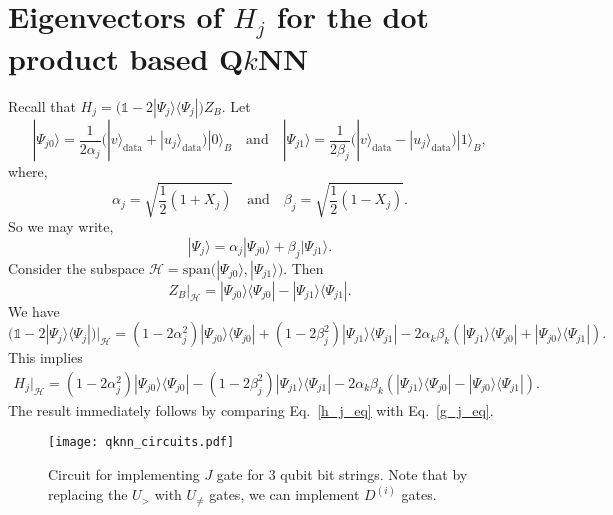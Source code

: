 \documentclass[a4paper,twocolumn,11pt,unpublished]{quantumarticle}
\newcommand{\rang}{\rangle}
\newcommand{\lang}{\langle}
\begin{document}
\section{Eigenvectors of $H_j$ for the dot product based  Q$k$NN} \label{eigH}
    Recall that $H_j = \Big( \mathds{1} - 2 |\Psi_{j}\rang \lang \Psi_{j}| \Big) Z_B$. Let 
    \begin{equation}
        |\Psi_{j0}\rang = \frac{1}{2 \alpha_j} \Big( |v\rang_{\text{data}} + |u_j\rang_{\text{data}}\Big) |0\rang_B \quad \text{and} \quad 
        |\Psi_{j1}\rang = \frac{1}{2 \beta_j} \Big( |v\rang_{\text{data}} - |u_j\rang_{\text{data}}\Big) |1\rang_B,
    \end{equation}
    where,
    \begin{equation}
        \alpha_j = \sqrt{\frac12(1 + X_j)} \quad \text{and} \quad \beta_j = \sqrt{\frac12(1 - X_j)}. 
    \end{equation}
    So we may write,
    \begin{equation}
        |\Psi_{j}\rang = \alpha_j |\Psi_{j0}\rang + \beta_j |\Psi_{j1}\rang.
    \end{equation}
    Consider the subspace $\mathcal{H} = \text{span}\Big(|\Psi_{j0}\rang, |\Psi_{j1}\rang\Big)$. Then
    \begin{equation}
        Z_B \Big|_{\mathcal{H}} = |\Psi_{j0}\rang \lang \Psi_{j0}|
        - |\Psi_{j1}\rang \lang \Psi_{j1}|. 
    \end{equation}
    We have
    \begin{equation}
        \Big( \mathds{1} - 2 |\Psi_{j}\rang \lang \Psi_{j}| \Big) \Big|_{\mathcal{H}} = (1 - 2\alpha_j ^ 2) |\Psi_{j0}\rang \lang \Psi_{j0}|+ (1 - 2\beta_j ^ 2) |\Psi_{j1}\rang \lang \Psi_{j1}|- 2\alpha_k \beta_k(|\Psi_{j1}\rang \lang \Psi_{j0}| + |\Psi_{j0}\rang \lang \Psi_{j1}|).
    \end{equation}
    This implies
    \begin{equation}    \label{h_j_eq}
        \begin{split}
            H_j \Big|_{\mathcal{H}} = (1 - 2\alpha_j ^ 2) |\Psi_{j0}\rang \lang \Psi_{j0}|- (1 - 2\beta_j ^ 2) |\Psi_{j1}\rang \lang \Psi_{j1}| - 2\alpha_k \beta_k(|\Psi_{j1}\rang \lang \Psi_{j0}| - |\Psi_{j0}\rang \lang \Psi_{j1}|).
        \end{split}
    \end{equation} 
    The result immediately follows by comparing Eq.~\eqref{h_j_eq} with Eq.~\eqref{g_j_eq}.

    \begin{figure}
            \begin{center}
                \texttt{[image: qknn\_circuits.pdf]}
                \caption{Circuit for implementing $J$ gate for $3$ qubit bit strings. Note that by replacing the $U_{>}$ with $U_{\neq}$ gates, we can implement $D ^ {(i)}$ gates.}
                \label{umain}
            \end{center}
    \end{figure}
\end{document}
